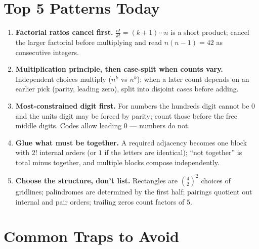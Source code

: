 \documentclass[11pt,a4paper]{article}
\begin{document}
\section*{Top 5 Patterns Today}

\begin{enumerate}[leftmargin=2em, itemsep=4pt]
  \item \textbf{Factorial ratios cancel first.} $\frac{n!}{k!}=(k+1)\cdots n$ is a short product; cancel the larger factorial before multiplying and read $n(n-1)=42$ as consecutive integers. 
  \item \textbf{Multiplication principle, then case-split when counts vary.} Independent choices multiply ($n^k$ vs $n^{\underline{k}}$); when a later count depends on an earlier pick (parity, leading zero), split into disjoint cases before adding. 
  \item \textbf{Most-constrained digit first.} For numbers the hundreds digit cannot be $0$ and the units digit may be forced by parity; count those before the free middle digits. Codes allow leading $0$ --- numbers do not. 
  \item \textbf{Glue what must be together.} A required adjacency becomes one block with $2!$ internal orders (or $1$ if the letters are identical); ``not together'' is total minus together, and multiple blocks compose independently. 
  \item \textbf{Choose the structure, don't list.} Rectangles are $\binom{4}{2}^2$ choices of gridlines; palindromes are determined by the first half; pairings quotient out internal and pair orders; trailing zeros count factors of $5$. 
\end{enumerate}

\section*{Common Traps to Avoid}
\end{document}

